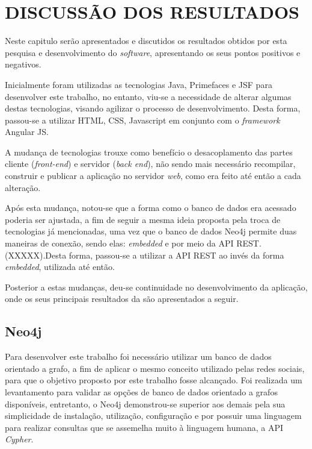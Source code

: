 
\chapter{DISCUSSÃO DOS RESULTADOS} 

\par Neste capitulo serão apresentados e discutidos os resultados obtidos por esta pesquisa e desenvolvimento do \textit{software}, apresentando os seus pontos positivos e negativos.

\par Inicialmente foram utilizadas as tecnologias Java, Primefaces e JSF para desenvolver este trabalho, no entanto, viu-se a necessidade de alterar algumas destas tecnologias, visando agilizar o processo de desenvolvimento. Desta forma, passou-se a utilizar HTML, CSS, Javascript em conjunto com o \textit{framework} Angular JS.

\par A mudança de tecnologias trouxe como benefício o desacoplamento das partes cliente (\textit{front-end}) e servidor (\textit{back end}), não sendo mais necessário recompilar, construir e publicar a aplicação no servidor \textit{web}, como era feito até então a cada alteração.

\par Após esta mudança, notou-se que a forma como o banco de dados era acessado poderia ser ajustada, a fim de seguir a mesma ideia proposta pela troca de tecnologias já mencionadas, uma vez que o banco de dados Neo4j permite duas maneiras de conexão, sendo elas: \textit{embedded} e por meio da API REST.(XXXXX).Desta forma, passou-se a utilizar a API REST ao invés da forma \textit{embedded}, utilizada até então.

\par Posterior a estas mudanças, deu-se continuidade no desenvolvimento da aplicação, onde os seus principais resultados da são apresentados a seguir.




\section{Neo4j}

\par Para desenvolver este trabalho foi necessário utilizar um banco de dados orientado a grafo, a fim de aplicar o mesmo conceito utilizado pelas redes sociais, para que o objetivo proposto por este trabalho fosse alcançado. Foi realizada um levantamento para validar as opções de banco de dados orientado a grafos disponíveis, entretanto, o Neo4j demonstrou-se superior aos demais pela sua simplicidade de instalação, utilização, configuração e por possuir uma linguagem para realizar consultas que se assemelha muito à linguagem humana, a API \textit{Cypher}.

